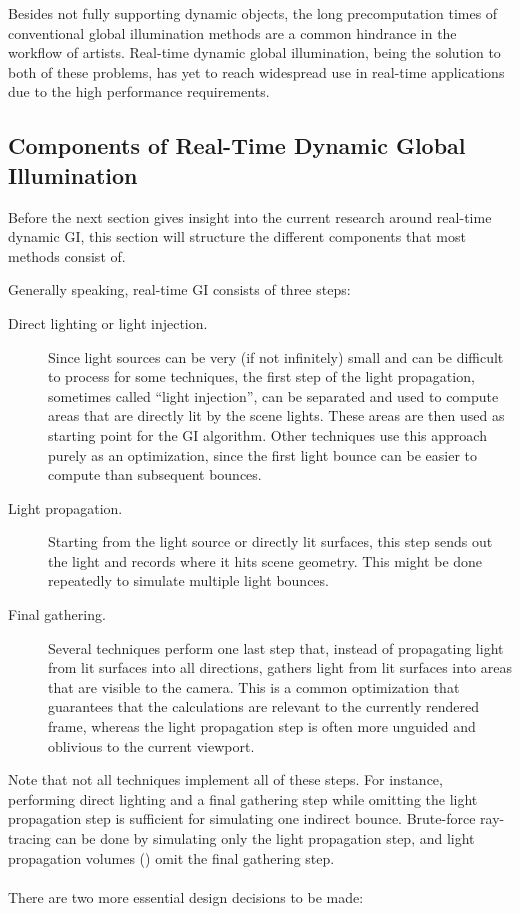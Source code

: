 Besides not fully supporting dynamic objects, the long precomputation times of conventional global illumination methods are a common hindrance in the workflow of artists. Real-time dynamic global illumination, being the solution to both of these problems, has yet to reach widespread use in real-time applications due to the high performance requirements.


\subsection{Components of Real-Time Dynamic Global Illumination}
\label{sec:intro:gi:components}

Before the next section gives insight into the current research around real-time dynamic GI, this section will structure the different components that most methods consist of.

Generally speaking, real-time GI consists of three steps:

\begin{description}
    \item[Direct lighting or light injection.] Since light sources can be very (if not infinitely) small and can be difficult to process for some techniques, the first step of the light propagation, sometimes called ``light injection'', can be separated and used to compute areas that are directly lit by the scene lights. These areas are then used as starting point for the GI algorithm. Other techniques use this approach purely as an optimization, since the first light bounce can be easier to compute than subsequent bounces.
    \item[Light propagation.] Starting from the light source or directly lit surfaces, this step sends out the light and records where it hits scene geometry. This might be done repeatedly to simulate multiple light bounces.
    \item[Final gathering.] Several techniques perform one last step that, instead of propagating light from lit surfaces into all directions, gathers light from lit surfaces into areas that are visible to the camera. This is a common optimization that guarantees that the calculations are relevant to the currently rendered frame, whereas the light propagation step is often more unguided and oblivious to the current viewport.
\end{description}%
%
Note that not all techniques implement all of these steps. For instance, performing direct lighting and a final gathering step while omitting the light propagation step is sufficient for simulating one indirect bounce. Brute-force ray-tracing can be done by simulating only the light propagation step, and light propagation volumes () omit the final gathering step.
\\
\\
There are two more essential design decisions to be made:


